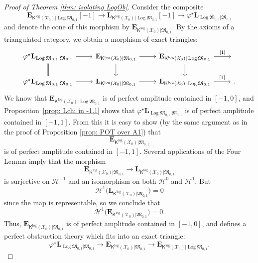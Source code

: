 \documentclass[11pt]{amsart}
\theoremstyle{definition}
\theoremstyle{definition}
\newcommand{\EE}{\mathbf{E}}
\newcommand{\LL}{\mathbf{L}}
\newcommand{\HH}{\mathcal{H}}
\newcommand{\Xcal}{\mathcal{X}}
\newcommand{\Mfrak}{\mathfrak{M}}
\newcommand{\Kup}{\mathsf{K}}
\newcommand{\Log}{\operatorname{Log}}
\begin{document}
\begin{proof}[Proof of Theorem \ref{thm: isolating LogOb}] Consider the composite
\begin{equation*} \EE_{\Kup^{\log}(\Xcal_0)|\Log\Mfrak_{0,1}}[-1] \to \LL_{\Kup^{\log}(\Xcal_0)|\Log\Mfrak_{0,1}}[-1] \to \varphi^\star \LL_{\Log\Mfrak_{0,1}|\Mfrak_{0,1}}\end{equation*}
and denote the cone of this morphism by $\EE_{\Kup^{\log}(\Xcal_0)|\Mfrak_{0,1}}$. By the axioms of a triangulated category, we obtain a morphism of exact triangles:
\begin{equation}\label{eqn: morphism of exact triangles comparing obstruction theories}
\begin{tikzcd}
\varphi^\star \LL_{\Log\Mfrak_{0,1}|\Mfrak_{0,1}} \ar[r] \ar[d,equals] & \EE_{\Kup^{\log}(\Xcal_0)|\Mfrak_{0,1}} \ar[r] \ar[d] & \EE_{\Kup^{\log}(\Xcal_0)|\Log\Mfrak_{0,1}} \ar[d] \ar[r,"{[1]}"] & \, \\
\varphi^\star \LL_{\Log\Mfrak_{0,1}|\Mfrak_{0,1}} \ar[r] & \LL_{\Kup^{\log}(\Xcal_0)|\Mfrak_{0,1}} \ar[r] & \LL_{\Kup^{\log}(\Xcal_0)|\Log\Mfrak_{0,1}} \ar[r,"{[1]}"] & .
\end{tikzcd}
\end{equation}
We know that $\EE_{\Kup^{\log}(\Xcal_0)|\Log\Mfrak_{0,1}}$ is of perfect amplitude contained in $[-1,0]$, and Proposition~\ref{prop: Lchi in -1,1} shows that $\varphi^\star \LL_{\Log\Mfrak_{0,1}|\Mfrak_{0,1}}$ is of perfect amplitude contained in $[-1,1]$. From this it is easy to show (by the same argument as in the proof of Proposition \ref{prop: POT over A1}) that
\[ \EE_{\Kup^{\log}(\Xcal_0)|\Mfrak_{0,1}}\] 
is of perfect amplitude contained in $[-1,1]$. Several applications of the Four Lemma imply that the morphism
\begin{equation*} \EE_{\Kup^{\log}(\Xcal_0)|\Mfrak_{0,1}} \to \LL_{\Kup^{\log}(\Xcal_0)|\Mfrak_{0,1}}\end{equation*}
is surjective on $\HH^{-1}$ and an isomorphism on both $\HH^0$ and $\HH^1$. But
\[ \HH^1 \big(\LL_{\Kup^{\log}(\Xcal_0)|\Mfrak_{0,1}}\big) = 0\]
since the map is representable, so we conclude that
\[ \HH^1\big(\EE_{\Kup^{\log}(\Xcal_0)|\Mfrak_{0,1}}\big)=0.\]
Thus, $\EE_{\Kup^{\log}(\Xcal_0)|\Mfrak_{0,1}}$ is of perfect amplitude contained in $[-1,0]$, and defines a perfect obstruction theory which fits into an exact triangle:
\begin{equation*} \varphi^\star \LL_{\Log\Mfrak_{0,1}|\Mfrak_{0,1}} \to \EE_{\Kup^{\log}(\Xcal_0)|\Mfrak_{0,1}} \to \EE_{\Kup^{\log}(\Xcal_0)|\Log\Mfrak_{0,1}}.\end{equation*}

\end{proof}
\end{document}
